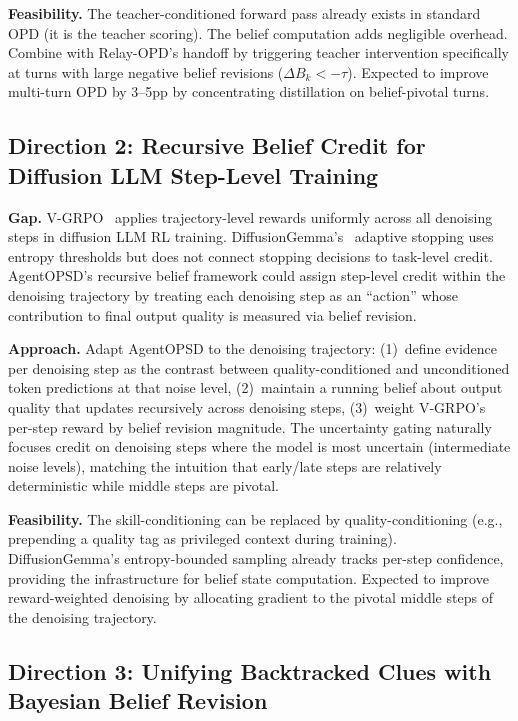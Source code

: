 \documentclass[11pt,a4paper]{article}
\begin{document}
\textbf{Feasibility.} The teacher-conditioned forward pass already exists in standard OPD (it is the teacher scoring). The belief computation adds negligible overhead. Combine with Relay-OPD's handoff by triggering teacher intervention specifically at turns with large negative belief revisions ($\Delta B_k < -\tau$). Expected to improve multi-turn OPD by 3--5pp by concentrating distillation on belief-pivotal turns.

\subsection{Direction 2: Recursive Belief Credit for Diffusion LLM Step-Level Training}

\textbf{Gap.} V-GRPO~\cite{vgrpo2026} applies trajectory-level rewards uniformly across all denoising steps in diffusion LLM RL training. DiffusionGemma's~\cite{diffusiongemma2026} adaptive stopping uses entropy thresholds but does not connect stopping decisions to task-level credit. AgentOPSD's recursive belief framework could assign step-level credit within the denoising trajectory by treating each denoising step as an ``action'' whose contribution to final output quality is measured via belief revision.

\textbf{Approach.} Adapt AgentOPSD to the denoising trajectory: (1)~define evidence per denoising step as the contrast between quality-conditioned and unconditioned token predictions at that noise level, (2)~maintain a running belief about output quality that updates recursively across denoising steps, (3)~weight V-GRPO's per-step reward by belief revision magnitude. The uncertainty gating naturally focuses credit on denoising steps where the model is most uncertain (intermediate noise levels), matching the intuition that early/late steps are relatively deterministic while middle steps are pivotal.

\textbf{Feasibility.} The skill-conditioning can be replaced by quality-conditioning (e.g., prepending a quality tag as privileged context during training). DiffusionGemma's entropy-bounded sampling already tracks per-step confidence, providing the infrastructure for belief state computation. Expected to improve reward-weighted denoising by allocating gradient to the pivotal middle steps of the denoising trajectory.

\subsection{Direction 3: Unifying Backtracked Clues with Bayesian Belief Revision}
\end{document}
